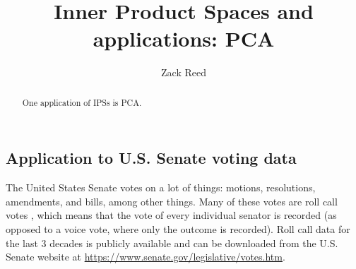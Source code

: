 \documentclass{ximera}
\author{Zack Reed}
\title{Inner Product Spaces and applications: PCA}
\begin{document}
\begin{abstract}

    One application of IPSs is PCA.

\end{abstract}
\maketitle


\subsection*{Application to U.S. Senate voting data}

The United States Senate%
%
%
 votes on a lot of things: motions,
resolutions, amendments, and bills, among other things. Many of these
votes are roll call votes%
%
, which means that the vote of every individual
senator is recorded (as opposed to a voice vote, where only the
outcome is recorded). Roll call data for the last 3 decades is
publicly available and can be downloaded from the U.S. Senate website
at \url{https://www.senate.gov/legislative/votes.htm}.
\end{document}
